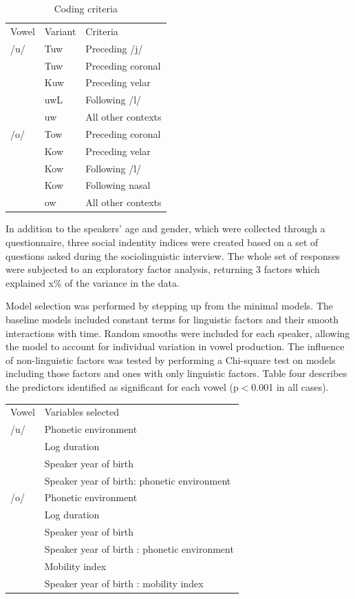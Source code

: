 \documentclass[12pt]{article}
\begin{document}
\vspace*{6pt}
\begin{table}[!htbp]
\centering
\begin{tabular}{l|l|l}
Vowel&Variant&Criteria \\
/u/&Tuw & Preceding /j/\\
&Tuw & Preceding coronal\\
&Kuw & Preceding velar\\
&uwL & Following /l/\\
&uw & All other contexts \\
/o/&Tow & Preceding coronal\\
&Kow & Preceding velar\\
&Kow & Following /l/\\
&Kow & Following nasal\\
&ow & All other contexts
\end{tabular}
\caption{Coding criteria}
\end{table}
\vspace*{6pt}

In addition to the speakers' age and gender, which were collected through a questionnaire, three social indentity indices were created based on a set of questions asked during the sociolinguistic interview. The whole set of responses were subjected to an exploratory factor analysis, returning 3 factors which explained x\% of the variance in the data. 

Model selection was performed by stepping up from the minimal models. The baseline models included constant terms for linguistic factors and their smooth interactions with time. Random smooths were included for each speaker, allowing the model to account for individual variation in vowel production.
The influence of non-linguistic factors was tested by performing a Chi-square test on models including those factors and ones with only linguistic factors. Table four describes the predictors identified as significant for each vowel (p$<$0.001 in all cases).
\newpage

\vspace*{6pt}
\begin{table}[!htbp]
\centering
\begin{tabular}{l|l}
Vowel&Variables selected\\
/u/&Phonetic environment\\
&Log duration\\
&Speaker year of birth\\
&Speaker year of birth: phonetic environment\\
/o/&Phonetic environment\\
&Log duration\\
&Speaker year of birth\\
&Speaker year of birth : phonetic environment\\
&Mobility index\\
&Speaker year of birth : mobility index
\end{tabular}
\end{table}
\vspace*{6pt}
\end{document}
